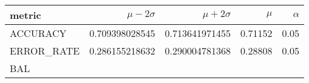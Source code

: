 \documentclass[11pt]{report}
\begin{document}
\begin{table}
    \centering
    \begin{tabular}{lrrrr}
    \hline
    
        \textbf{ metric }
        
           &
        
    
        \textbf{ $\mu - 2\sigma$ }
        
           &
        
    
        \textbf{ $\mu + 2\sigma$ }
        
           &
        
    
        \textbf{ $\mu$ }
        
           &
        
    
        \textbf{ $\alpha$ }
        
     
    \\
    \hline
    
        
            ACCURACY
             
               &
            
        
            0.709398028545
             
               &
            
        
            0.713641971455
             
               &
            
        
            0.71152
             
               &
            
        
            0.05
            
        
        \\
    
        
            ERROR\_RATE
             
               &
            
        
            0.286155218632
             
               &
            
        
            0.290004781368
             
               &
            
        
            0.28808
             
               &
            
        
            0.05
            
        
        \\
    
        
            BAL
             

\end{tabular}
\end{table}
\end{document}
